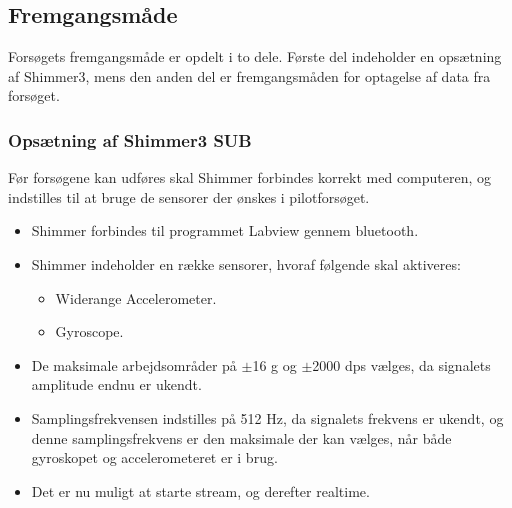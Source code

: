 \subsection{Fremgangsmåde}
Forsøgets fremgangsmåde er opdelt i to dele. Første del indeholder en opsætning af Shimmer3, mens den anden del er fremgangsmåden for optagelse af data fra forsøget.

\subsubsection{Opsætning af Shimmer3 SUB}
Før forsøgene kan udføres skal Shimmer forbindes korrekt med computeren, og indstilles til at bruge de sensorer der ønskes i pilotforsøget. \vspace{-3mm}
\begin{itemize}
	\item Shimmer forbindes til programmet Labview gennem bluetooth.
	\item Shimmer indeholder en række sensorer, hvoraf følgende skal aktiveres: 
	\begin{itemize}
		\item Widerange Accelerometer.
		\item Gyroscope.
	\end{itemize}
	\item De maksimale arbejdsområder på $\pm$16 g og $\pm$2000 dps vælges, da signalets amplitude endnu er ukendt.
	\item Samplingsfrekvensen indstilles på 512 Hz, da signalets frekvens er ukendt, og denne samplingsfrekvens er den maksimale der kan vælges, når både gyroskopet og accelerometeret er i brug.  
	\item Det er nu muligt at starte stream, og derefter realtime.
\end{itemize}

